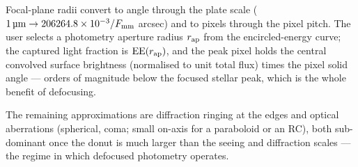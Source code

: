 Focal-plane radii convert to angle through the plate scale
($\SI{1}{\micro\metre} \to 206264.8\times10^{-3}/F_{\rm mm}$ arcsec) and to
pixels through the pixel pitch. The user selects a photometry aperture radius
$r_{\rm ap}$ from the encircled-energy curve; the captured light fraction is
$\mathrm{EE}(r_{\rm ap})$, and the peak pixel holds the central convolved
surface brightness (normalised to unit total flux) times the pixel solid
angle --- orders of magnitude below the focused stellar peak, which is the
whole benefit of defocusing.

The remaining approximations are diffraction ringing at the edges and
optical aberrations (spherical, coma; small on-axis for a paraboloid or an
RC), both sub-dominant once the donut is much larger than the seeing and
diffraction scales --- the regime in which defocused photometry operates.
